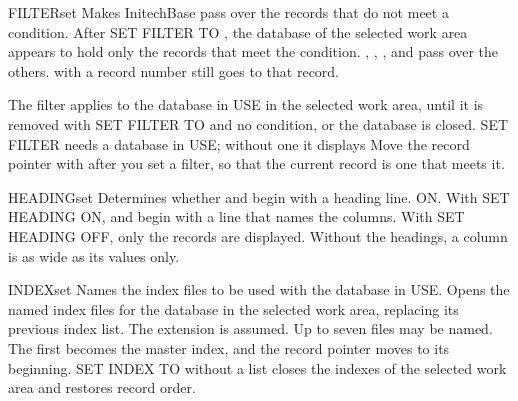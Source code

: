 \begin{XbaseEntry}{FILTER}{set}
Makes InitechBase pass over the records that do not meet a condition.
\Syntax
{}
\Usage
After SET FILTER TO , the database of the selected work area
appears to hold only the records that meet the condition.  ,
, ,  and  pass over the others.
 with a record number still goes to that record.

The filter applies to the database in USE in the selected work area, until it
is removed with SET FILTER TO and no condition, or the database is closed.
SET FILTER needs a database in USE; without one it displays
\Tips
Move the record pointer with  after you set a filter, so that the
current record is one that meets it.
\Examples
{}
\end{XbaseEntry}

\begin{XbaseEntry}{HEADING}{set}
Determines whether  and  begin with a heading line.
\Syntax
{}
\Defaults
ON.
\Usage
With SET HEADING ON,  and  begin with a line that names
the columns.  With SET HEADING OFF, only the records are displayed.  Without
the headings, a column is as wide as its values only.
\Examples
{}
\end{XbaseEntry}

\begin{XbaseEntry}{INDEX}{set}
Names the index files to be used with the database in USE.
\Syntax
{}
\Usage
Opens the named index files for the database in the selected work area,
replacing its previous index list.  The extension  is assumed.
Up to seven files may be named.  The first becomes the master index, and
the record pointer moves to its beginning.  SET INDEX TO without a list
closes the indexes of the selected work area and restores record order.
\Examples
{}
\end{XbaseEntry}

